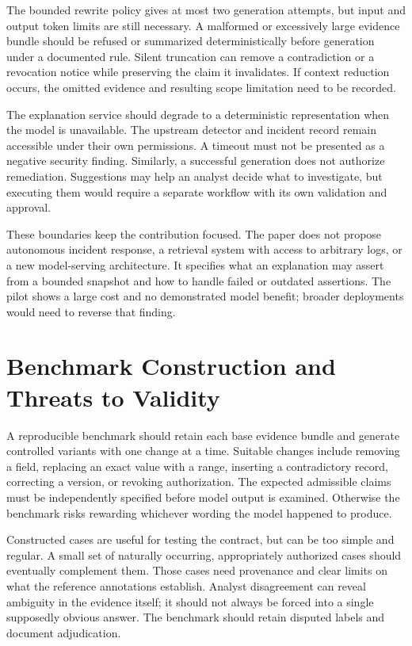 The bounded rewrite policy gives at most two generation attempts, but input and output token limits are still necessary. A malformed or excessively large evidence bundle should be refused or summarized deterministically before generation under a documented rule. Silent truncation can remove a contradiction or a revocation notice while preserving the claim it invalidates. If context reduction occurs, the omitted evidence and resulting scope limitation need to be recorded.

The explanation service should degrade to a deterministic representation when the model is unavailable. The upstream detector and incident record remain accessible under their own permissions. A timeout must not be presented as a negative security finding. Similarly, a successful generation does not authorize remediation. Suggestions may help an analyst decide what to investigate, but executing them would require a separate workflow with its own validation and approval.

These boundaries keep the contribution focused. The paper does not propose autonomous incident response, a retrieval system with access to arbitrary logs, or a new model-serving architecture. It specifies what an explanation may assert from a bounded snapshot and how to handle failed or outdated assertions. The pilot shows a large cost and no demonstrated model benefit; broader deployments would need to reverse that finding.

\section{Benchmark Construction and Threats to Validity}
A reproducible benchmark should retain each base evidence bundle and generate controlled variants with one change at a time. Suitable changes include removing a field, replacing an exact value with a range, inserting a contradictory record, correcting a version, or revoking authorization. The expected admissible claims must be independently specified before model output is examined. Otherwise the benchmark risks rewarding whichever wording the model happened to produce.

Constructed cases are useful for testing the contract, but can be too simple and regular. A small set of naturally occurring, appropriately authorized cases should eventually complement them. Those cases need provenance and clear limits on what the reference annotations establish. Analyst disagreement can reveal ambiguity in the evidence itself; it should not always be forced into a single supposedly obvious answer. The benchmark should retain disputed labels and document adjudication.

